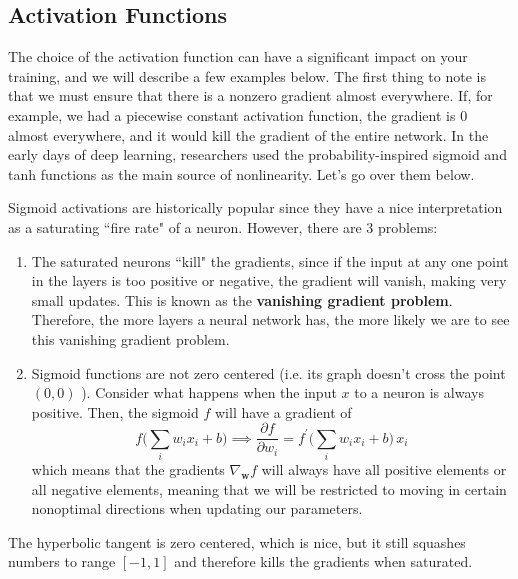 \documentclass{article}
\begin{document}
  \subsection{Activation Functions} 

    The choice of the activation function can have a significant impact on your training, and we will describe a few examples below. The first thing to note is that we must ensure that there is a nonzero gradient almost everywhere. If, for example, we had a piecewise constant activation function, the gradient is $0$ almost everywhere, and it would kill the gradient of the entire network. In the early days of deep learning, researchers used the probability-inspired sigmoid and tanh functions as the main source of nonlinearity. Let's go over them below. 

    \begin{definition}[Sigmoid]
      Sigmoid activations are historically popular since they have a nice interpretation as a saturating ``fire rate" of a neuron. However, there are 3 problems: 
      \begin{enumerate}
        \item The saturated neurons ``kill" the gradients, since if the input at any one point in the layers is too positive or negative, the gradient will vanish, making very small updates. This is known as the \textbf{vanishing gradient problem}. Therefore, the more layers a neural network has, the more likely we are to see this vanishing gradient problem. 
        \item Sigmoid functions are not zero centered (i.e. its graph doesn't cross the point $(0, 0)$ ). Consider what happens when the input $x$ to a neuron is always positive. Then, the sigmoid $f$ will have a gradient of 
        \[f \bigg( \sum_i w_i x_i + b \bigg) \implies \frac{\partial f}{\partial w_i} = f^\prime \bigg( \sum_i w_i x_i + b \bigg) 
        \, x_i\]
        which means that the gradients $\nabla_\mathbf{w} f$ will always have all positive elements or all negative elements, meaning that we will be restricted to moving in certain nonoptimal directions when updating our parameters. 
      \end{enumerate}
    \end{definition} 

    \begin{definition}
      The hyperbolic tangent is zero centered, which is nice, but it still squashes numbers to range $[-1, 1]$ and therefore kills the gradients when saturated. 
    \end{definition}
\end{document}
